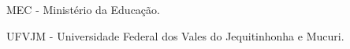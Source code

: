 \begin{siglas}

    MEC - Ministério da Educação.

    UFVJM - Universidade Federal dos Vales do Jequitinhonha e Mucuri.

\end{siglas}